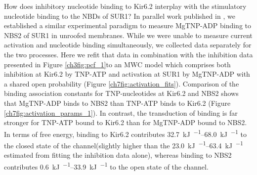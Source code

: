How does inhibitory nucleotide binding to Kir6.2 interplay with the stimulatory nucleotide binding to the NBDs of SUR1?
In parallel work published in \textcite{puljung_activation_2019-1}, we established a similar experimental paradigm to measure MgTNP-ADP binding to NBS2 of SUR1 in unroofed membranes.
While we were unable to measure current activation and nucleotide binding simultaneously, we collected data separately for the two processes.
Here we refit that data in combination with the inhibition data presented in Figure \ref{ch3fig:pcf_1}to an MWC model which comprises both inhibition at Kir6.2 by TNP-ATP and activation at SUR1 by MgTNP-ADP with a shared open probability (Figure \ref{ch7fig:activation_fits}).
Comparison of the binding association constants for TNP-nucleotides at Kir6.2 and NBS2 shows that MgTNP-ADP binds  to NBS2 than TNP-ATP binds to Kir6.2 (Figure \ref{ch7fig:activation_params_1}).
In contrast, the transduction of binding is far stronger for TNP-ATP bound to Kir6.2 than for MgTNP-ADP bound to NBS2.
In terms of free energy, binding to Kir6.2 contributes \SIrange{32.7}{68.0}{\kilo\joule\per\Molar} to the closed state of the channel(slightly higher than the \SIrange{23.0}{63.4}{\kilo\joule\per\Molar} estimated from fitting the inhibition data alone), whereas binding to NBS2 contributes \SIrange{0.6}{33.9}{\kilo\joule\per\Molar} to the open state of the channel.

